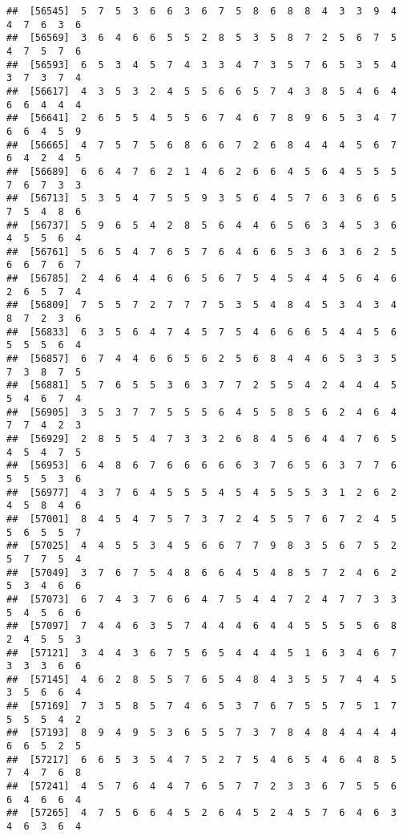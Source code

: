 \documentclass[
]{book}
\begin{document}
\begin{verbatim}
##  [56545]  5  7  5  3  6  6  3  6  7  5  8  6  8  8  4  3  3  9  4  4  7  6  3  6
##  [56569]  3  6  4  6  6  5  5  2  8  5  3  5  8  7  2  5  6  7  5  4  7  5  7  6
##  [56593]  6  5  3  4  5  7  4  3  3  4  7  3  5  7  6  5  3  5  4  3  7  3  7  4
##  [56617]  4  3  5  3  2  4  5  5  6  6  5  7  4  3  8  5  4  6  4  6  6  4  4  4
##  [56641]  2  6  5  5  4  5  5  6  7  4  6  7  8  9  6  5  3  4  7  6  6  4  5  9
##  [56665]  4  7  5  7  5  6  8  6  6  7  2  6  8  4  4  4  5  6  7  6  4  2  4  5
##  [56689]  6  6  4  7  6  2  1  4  6  2  6  6  4  5  6  4  5  5  5  7  6  7  3  3
##  [56713]  5  3  5  4  7  5  5  9  3  5  6  4  5  7  6  3  6  6  5  7  5  4  8  6
##  [56737]  5  9  6  5  4  2  8  5  6  4  4  6  5  6  3  4  5  3  6  4  5  5  6  4
##  [56761]  5  6  5  4  7  6  5  7  6  4  6  6  5  3  6  3  6  2  5  6  6  7  6  7
##  [56785]  2  4  6  4  4  6  6  5  6  7  5  4  5  4  4  5  6  4  6  2  6  5  7  4
##  [56809]  7  5  5  7  2  7  7  7  5  3  5  4  8  4  5  3  4  3  4  8  7  2  3  6
##  [56833]  6  3  5  6  4  7  4  5  7  5  4  6  6  6  5  4  4  5  6  5  5  5  6  4
##  [56857]  6  7  4  4  6  6  5  6  2  5  6  8  4  4  6  5  3  3  5  7  3  8  7  5
##  [56881]  5  7  6  5  5  3  6  3  7  7  2  5  5  4  2  4  4  4  5  5  4  6  7  4
##  [56905]  3  5  3  7  7  5  5  5  6  4  5  5  8  5  6  2  4  6  4  7  7  4  2  3
##  [56929]  2  8  5  5  4  7  3  3  2  6  8  4  5  6  4  4  7  6  5  4  5  4  7  5
##  [56953]  6  4  8  6  7  6  6  6  6  6  3  7  6  5  6  3  7  7  6  5  5  5  3  6
##  [56977]  4  3  7  6  4  5  5  5  4  5  4  5  5  5  3  1  2  6  2  4  5  8  4  6
##  [57001]  8  4  5  4  7  5  7  3  7  2  4  5  5  7  6  7  2  4  5  5  6  5  5  7
##  [57025]  4  4  5  5  3  4  5  6  6  7  7  9  8  3  5  6  7  5  2  5  7  7  5  4
##  [57049]  3  7  6  7  5  4  8  6  6  4  5  4  8  5  7  2  4  6  2  5  3  4  6  6
##  [57073]  6  7  4  3  7  6  6  4  7  5  4  4  7  2  4  7  7  3  3  5  4  5  6  6
##  [57097]  7  4  4  6  3  5  7  4  4  4  6  4  4  5  5  5  5  6  8  2  4  5  5  3
##  [57121]  3  4  4  3  6  7  5  6  5  4  4  4  5  1  6  3  4  6  7  3  3  3  6  6
##  [57145]  4  6  2  8  5  5  7  6  5  4  8  4  3  5  5  7  4  4  5  3  5  6  6  4
##  [57169]  7  3  5  8  5  7  4  6  5  3  7  6  7  5  5  7  5  1  7  5  5  5  4  2
##  [57193]  8  9  4  9  5  3  6  5  5  7  3  7  8  4  8  4  4  4  4  6  6  5  2  5
##  [57217]  6  6  5  3  5  4  7  5  2  7  5  4  6  5  4  6  4  8  5  7  4  7  6  8
##  [57241]  4  5  7  6  4  4  7  6  5  7  7  2  3  3  6  7  5  5  6  6  4  6  6  4
##  [57265]  4  7  5  6  6  4  5  2  6  4  5  2  4  5  7  6  4  6  3  4  6  3  6  4

\end{verbatim}
\end{document}
